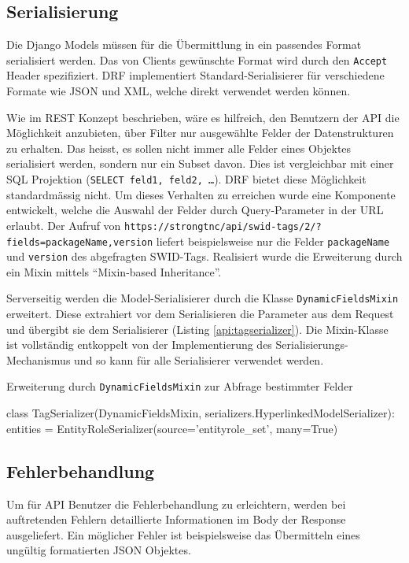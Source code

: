 \subsection{Serialisierung}
\label{api:serialisierung}
Die Django Models müssen für die Übermittlung in ein passendes Format
serialisiert werden. Das von Clients gewünschte Format wird durch den
\texttt{Accept} Header spezifiziert. DRF implementiert Standard-Serialisierer
für verschiedene Formate wie JSON und XML, welche direkt verwendet werden
können.

Wie im REST Konzept beschrieben, wäre es hilfreich, den Benutzern der API die
Möglichkeit anzubieten, über Filter nur ausgewählte Felder der Datenstrukturen
zu erhalten. Das heisst, es sollen nicht immer alle Felder eines Objektes
serialisiert werden, sondern nur ein Subset davon.  Dies ist vergleichbar mit
einer SQL Projektion (\texttt{SELECT feld1, feld2, \ldots}). DRF bietet diese
Möglichkeit standardmässig nicht. Um dieses Verhalten zu erreichen wurde eine
Komponente entwickelt, welche die Auswahl der Felder durch Query-Parameter in
der URL erlaubt. Der Aufruf von
\texttt{https://strongtnc/api/swid-tags/2/?fields=packageName,version} liefert
beispielsweise nur die Felder \texttt{packageName} und \texttt{version} des
abgefragten SWID-Tags. Realisiert wurde die Erweiterung durch ein Mixin mittels
\enquote{Mixin-based Inheritance}\cite{bracha1990mixin}.

Serverseitig werden die Model-Serialisierer durch die Klasse
\texttt{DynamicFieldsMixin} erweitert. Diese extrahiert vor dem Serialisieren
die Parameter aus dem Request und übergibt sie dem Serialisierer (Listing
\ref{api:tagserializer}). Die Mixin-Klasse ist vollständig entkoppelt von der
Implementierung des Serialisierungs-Mechanismus und so kann für alle
Serialisierer verwendet werden.

\begin{listing}[H]
\caption{Erweiterung durch \texttt{DynamicFieldsMixin} zur Abfrage bestimmter Felder}
\label{api:tagserializer}
\begin{pythoncode}
class TagSerializer(DynamicFieldsMixin, serializers.HyperlinkedModelSerializer):
    entities = EntityRoleSerializer(source='entityrole_set', many=True)
\end{pythoncode}
\end{listing}

\subsection{Fehlerbehandlung}
Um für API Benutzer die Fehlerbehandlung zu erleichtern, werden bei auftretenden
Fehlern detaillierte Informationen im Body der Response ausgeliefert. Ein
möglicher Fehler ist beispielsweise das Übermitteln eines ungültig formatierten
JSON Objektes.

